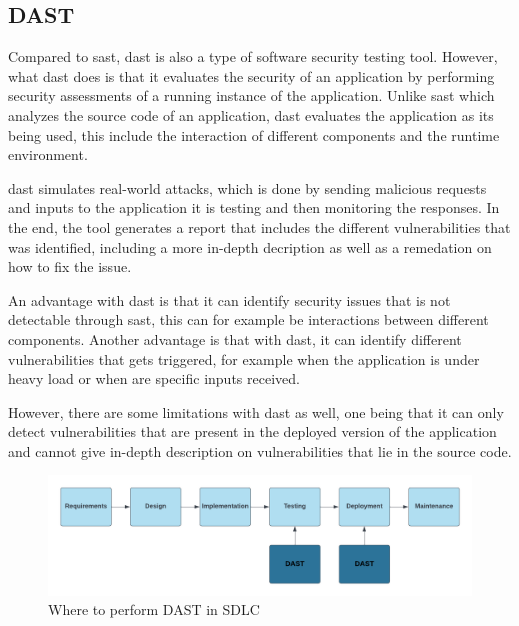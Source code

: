\newpage
\subsection{DAST}
Compared to \acrshort{sast}, \acrlong{dast} is also a type of software security testing tool. However, what \acrshort{dast} does is that it evaluates the security of an application by performing security assessments of a running instance of the application. Unlike \acrshort{sast} which analyzes the source code of an application, \acrshort{dast} evaluates the application as its being used, this include the interaction of different components and the runtime environment. 

\acrshort{dast} simulates real-world attacks, which is done by sending malicious requests and inputs to the application it is testing and then monitoring the responses. In the end, the tool generates a report that includes the different vulnerabilities that was identified, including a more in-depth decription as well as a remedation on how to fix the issue. \cite{dast}

An advantage with \acrshort{dast} is that it can identify security issues that is not detectable through \acrshort{sast}, this can for example be interactions between different components. Another advantage is that with \acrshort{dast}, it can identify different vulnerabilities that gets triggered, for example when the application is under heavy load or when are specific inputs received.

However, there are some limitations with \acrshort{dast} as well, one being that it can only detect vulnerabilities that are present in the deployed version of the application and cannot give in-depth description on vulnerabilities that lie in the source code.

\begin{figure}[H]
    \centering
    \includegraphics[width=1\columnwidth]{Images/DAST.png}
    \caption{Where to perform DAST in SDLC} 
    \label{fig:Where to perform DAST in SDLC}
\end{figure}

\newpage

